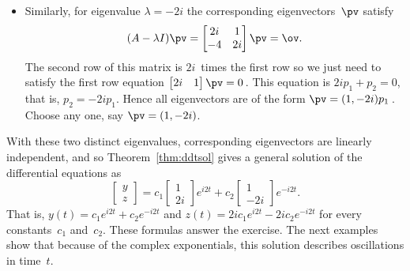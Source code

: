 \begin{example}
\begin{solution}
\begin{itemize}
\item Similarly, for eigenvalue \(\lambda=-2i\) the corresponding eigenvectors~\(\pv\) satisfy
\begin{equation*}
(A-\lambda I)\pv=\begin{bmatrix} 2i&1\\-4&2i \end{bmatrix}\pv
=\ov.
\end{equation*}
The second row of this matrix is \(2i\)~times the first row so we just need to satisfy the first row equation \(\begin{bmatrix} 2i&1 \end{bmatrix}\pv=0\)\,.
This equation is \(2ip_1+p_2=0\), that is, \(p_2=-2ip_1\).
Hence all eigenvectors are of the form \(\pv=(1,-2i)p_1\)\,.
Choose any one, say \(\pv=(1,-2i)\).
\end{itemize}
With these two distinct eigenvalues, corresponding eigenvectors are linearly independent, and so Theorem~\ref{thm:ddtsol} gives a general solution of the differential equations as
\begin{equation*}
\begin{bmatrix} y\\z \end{bmatrix}
=c_1\begin{bmatrix} 1\\2i \end{bmatrix}e^{i2t}
+c_2\begin{bmatrix} 1\\-2i \end{bmatrix}e^{-i2t}.
\end{equation*}
That is, \(y(t)=c_1e^{i2t}+c_2e^{-i2t}\) and \(z(t)=2ic_1e^{i2t}-2ic_2e^{-i2t}\) for every constants~\(c_1\) and~\(c_2\).
These formulas answer the exercise.
The next examples show that because of the complex exponentials, this solution describes oscillations in time~\(t\).
\end{solution}
\end{example}




